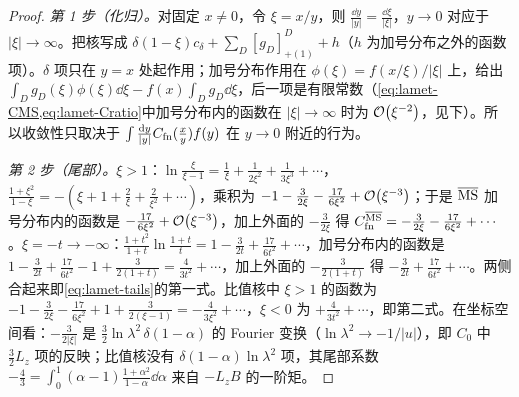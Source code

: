 \begin{proof}
\emph{第 1 步（化归）。}对固定 $x\neq0$，令 $\xi=x/y$，则 $\frac{\dd y}{|y|}=\frac{\dd\xi}{|\xi|}$，$y\to0$ 对应于 $|\xi|\to\infty$。把核写成 $\delta(1-\xi)c_\delta+\sum_D[g_D]^D_{+(1)}+h$（$h$ 为加号分布之外的函数项）。$\delta$ 项只在 $y=x$ 处起作用；加号分布作用在 $\phi(\xi)=f(x/\xi)/|\xi|$ 上，给出 $\int_Dg_D(\xi)\phi(\xi)\dd\xi-f(x)\int_Dg_D\dd\xi$，后一项是有限常数（\cref{eq:lamet-CMS,eq:lamet-Cratio}中加号分布内的函数在 $|\xi|\to\infty$ 时为 $\mathcal{O}\!\left(\xi^{-2}\right)$，见下）。所以收敛性只取决于 $\int\frac{\mathrm{d} y}{|y|}C_{\rm fn}(\frac xy)f(y)$ 在 $y\to0$ 附近的行为。

\emph{第 2 步（尾部）。}$\xi>1$：$\ln\frac\xi{\xi-1}=\frac1\xi+\frac1{2\xi^2}+\frac1{3\xi^3}+\cdots$，$\frac{1+\xi^2}{1-\xi}=-(\xi+1+\frac2\xi+\frac2{\xi^2}+\cdots)$，乘积为 $-1-\frac3{2\xi}-\frac{17}{6\xi^2}+\mathcal{O}\!\left(\xi^{-3}\right)$；于是 $\overline{\mathrm{MS}}$ 加号分布内的函数是 $-\frac{17}{6\xi^2}+\mathcal{O}\!\left(\xi^{-3}\right)$，加上外面的 $-\frac3{2\xi}$ 得 $C^{\overline{\mathrm{MS}}}_{\rm fn}=-\frac3{2\xi}-\frac{17}{6\xi^2}+\cdots$。$\xi=-t\to-\infty$：$\frac{1+t^2}{1+t}\ln\frac{1+t}t=1-\frac3{2t}+\frac{17}{6t^2}+\cdots$，加号分布内的函数是 $1-\frac3{2t}+\frac{17}{6t^2}-1+\frac3{2(1+t)}=\frac4{3t^2}+\cdots$，加上外面的 $-\frac3{2(1+t)}$ 得 $-\frac3{2t}+\frac{17}{6t^2}+\cdots$。两侧合起来即\cref{eq:lamet-tails}的第一式。比值核中 $\xi>1$ 的函数为 $-1-\frac3{2\xi}-\frac{17}{6\xi^2}+1+\frac3{2(\xi-1)}=-\frac4{3\xi^2}+\cdots$，$\xi<0$ 为 $+\frac4{3t^2}+\cdots$，即第二式。在坐标空间看：$-\frac{3}{2|\xi|}$ 是 $\frac32\ln\lambda^2\,\delta(1-\alpha)$ 的 Fourier 变换（$\ln\lambda^2\to-1/|u|$），即 $C_0$ 中 $\frac32L_z$ 项的反映；比值核没有 $\delta(1-\alpha)\ln\lambda^2$ 项，其尾部系数 $-\frac43=\int_0^1(\alpha-1)\frac{1+\alpha^2}{1-\alpha}\dd\alpha$ 来自 $-L_zB$ 的一阶矩。


\end{proof}
